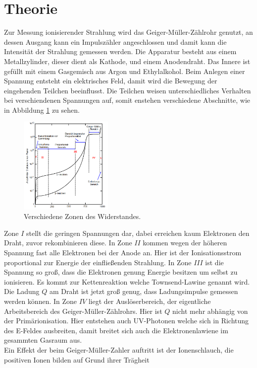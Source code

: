 \section{Theorie}
\label{sec:Theorie}
Zur Messung ionisierender Strahlung wird das Geiger-Müller-Zählrohr genutzt, an dessen Ausgang kann ein
Impulszähler angeschlossen und damit kann die Intensität der Strahlung gemessen werden.
Die Apparatur besteht aus einem Metallzylinder, dieser dient als Kathode, und einem Anodendraht. Das Innere ist gefüllt mit einem Gasgemisch
aus Argon und Ethylalkohol.
Beim Anlegen einer Spannung entsteht ein elektrisches Feld, damit wird die Bewegung der eingehenden Teilchen beeinflusst.
Die Teilchen weisen unterschiedliches Verhalten bei verschiendenen Spannungen auf, somit enstehen verschiedene Abschnitte, wie
in Abbildung \ref{fig:bereich} zu sehen.
\begin{figure}
  \centering
  \includegraphics[width=0.4\textwidth]{bereiche.PNG}
  \caption{Verschiedene Zonen des Widerstandes.}
  \label{fig:bereich}
\end{figure}
Zone $I$ stellt die geringen Spannungen dar, dabei erreichen kaum Elektronen den Draht, zuvor rekombinieren diese.
In Zone $II$ kommen wegen der höheren Spannung fast alle Elektronen bei der Anode an. Hier ist der Ionisationsstrom proportional
zur Energie der einfließenden Strahlung.
In Zone $III$ ist die Spannung so groß, dass die Elektronen genung Energie besitzen um selbst zu ionisieren. Es kommt zur Kettenreaktion
welche Townsend-Lawine genannt wird. Die Ladung $Q$ am Draht ist jetzt groß genug, dass Ladungsimpulse gemessen werden können.
In Zone $IV$ liegt der Auslöserbereich, der eigentliche Arbeitsbereich des Geiger-Müller-Zählrohrs. Hier ist $Q$ nicht mehr abhängig
von der Primärionisation. Hier entstehen auch UV-Photonen welche sich in Richtung des E-Feldes ausbreiten, damit breitet sich auch die
Elektronenlawiene im gesammten Gasraum aus.\\
Ein Effekt der beim Geiger-Müller-Zahler auftritt ist der Ionenschlauch, die positiven Ionen bilden auf Grund ihrer Trägheit
